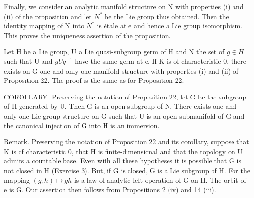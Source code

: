 Finally, we consider an analytic manifold structure on N with properties (i) and (ii) of the proposition and let \(N^{*}\) be the Lie group thus obtained. Then the identity mapping of N into \(N^{*}\) is étale at e and hence a Lie group isomorphism. This proves the uniqueness assertion of the proposition.

Let H be a Lie group, U a Lie quasi-subgroup germ of H and N the set of \(g \in H\) such that U and \(gUg^{-1}\) have the same germ at e. If K is of characteristic 0, there exists on G one and only one manifold structure with properties (i) and (ii) of Proposition 22. The proof is the same as for Proposition 22.

COROLLARY. Preserving the notation of Proposition 22, let G be the subgroup of H generated by U. Then G is an open subgroup of N. There exists one and only one Lie group structure on G such that U is an open submanifold of G and the canonical injection of G into H is an immersion.

Remark. Preserving the notation of Proposition 22 and its corollary, suppose that K is of characteristic 0, that H is finite-dimensional and that the topology on U admits a countable base. Even with all these hypotheses it is possible that G is not closed in H (Exercise 3). But, if G is closed, G is a Lie subgroup of H. For the mapping \((g,h)\mapsto gh\) is a law of analytic left operation of G on H. The orbit of e is G. Our assertion then follows from Propositions 2 (iv) and 14 (iii).

